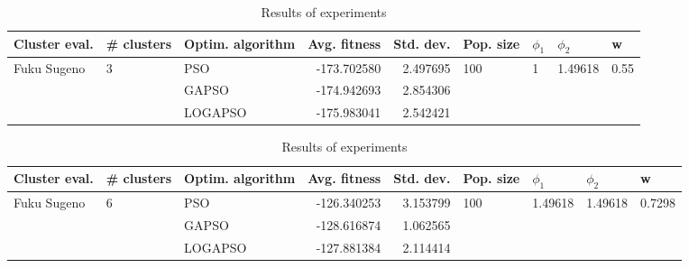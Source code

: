 \documentclass{article}
\begin{document}
\begin{table}
\centering
\caption{Results of experiments}
\begin{tabular}{lllrrllll}
\toprule
               Cluster eval. &        \# clusters & Optim. algorithm &  Avg. fitness &  Std. dev. &            Pop. size &         $\phi_{1}$ &               $\phi_{2}$ &                     w \\
\midrule
\multirow{3}{*}{Fuku Sugeno} & \multirow{3}{*}{3} &              PSO &   -173.702580 &   2.497695 & \multirow{3}{*}{100} & \multirow{3}{*}{1} & \multirow{3}{*}{1.49618} & \multirow{3}{*}{0.55} \\
                             &                    &            GAPSO &   -174.942693 &   2.854306 &                      &                    &                          &                       \\
                             &                    &          LOGAPSO &   -175.983041 &   2.542421 &                      &                    &                          &                       \\
\bottomrule
\end{tabular}
\end{table}
\begin{table}
\centering
\caption{Results of experiments}
\begin{tabular}{lllrrllll}
\toprule
               Cluster eval. &        \# clusters & Optim. algorithm &  Avg. fitness &  Std. dev. &            Pop. size &               $\phi_{1}$ &               $\phi_{2}$ &                       w \\
\midrule
\multirow{3}{*}{Fuku Sugeno} & \multirow{3}{*}{6} &              PSO &   -126.340253 &   3.153799 & \multirow{3}{*}{100} & \multirow{3}{*}{1.49618} & \multirow{3}{*}{1.49618} & \multirow{3}{*}{0.7298} \\
                             &                    &            GAPSO &   -128.616874 &   1.062565 &                      &                          &                          &                         \\
                             &                    &          LOGAPSO &   -127.881384 &   2.114414 &                      &                          &                          &                         \\
\bottomrule
\end{tabular}
\end{table}
\end{document}
